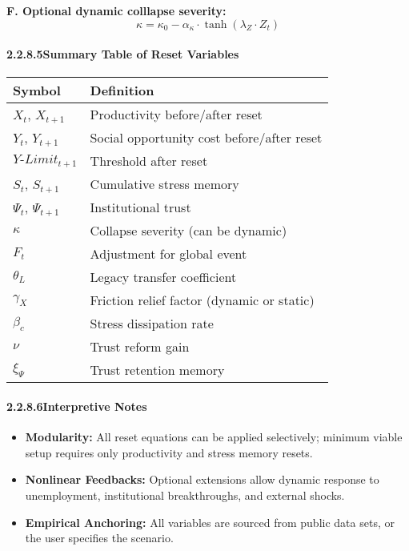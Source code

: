 \documentclass[12pt]{report}
\begin{document}
\textbf{F. Optional dynamic colllapse severity:}
\[
\kappa = \kappa_0 - \alpha_\kappa \cdot \tanh(\lambda_Z \cdot Z_t)
\]

\vspace{1em}

\paragraph{2.2.8.5\quad Summary Table of Reset Variables}
\begin{center}
\begin{tabular}{|l|p{8cm}|}
\hline
\textbf{Symbol} & \textbf{Definition} \\
\hline
$X_t$, $X_{t+1}$ & Productivity before/after reset \\
$Y_t$, $Y_{t+1}$ & Social opportunity cost before/after reset \\
$Y\text{-}Limit_{t+1}$ & Threshold after reset \\
$S_t$, $S_{t+1}$ & Cumulative stress memory \\
$\Psi_t$, $\Psi_{t+1}$ & Institutional trust \\
$\kappa$ & Collapse severity (can be dynamic) \\
$F_t$ & Adjustment for global event \\
$\theta_L$ & Legacy transfer coefficient \\
$\gamma_X$ & Friction relief factor (dynamic or static) \\
$\beta_c$ & Stress dissipation rate \\
$\nu$ & Trust reform gain \\
$\xi_\Psi$ & Trust retention memory \\
\hline
\end{tabular}
\end{center}

\paragraph{2.2.8.6\quad Interpretive Notes}

\begin{itemize}
  \item \textbf{Modularity:} All reset equations can be applied selectively; minimum viable setup requires only productivity and stress memory resets.
  \item \textbf{Nonlinear Feedbacks:} Optional extensions allow dynamic response to unemployment, institutional breakthroughs, and external shocks.
  \item \textbf{Empirical Anchoring:} All variables are sourced from public data sets, or the user specifies the scenario.
\end{itemize}
\end{document}
